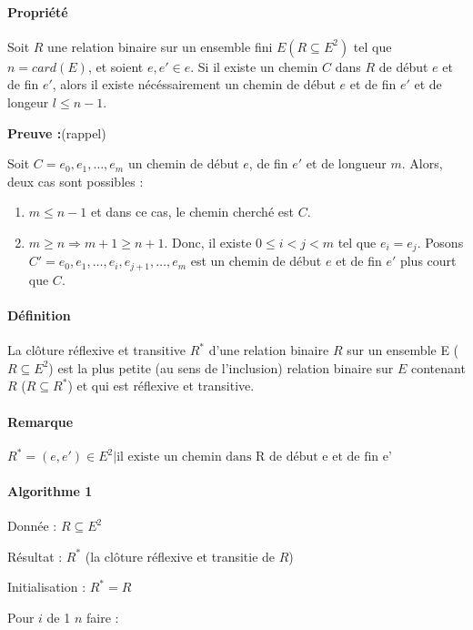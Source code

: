 \documentclass[12pt, a4paper]{report}
\begin{document}
\paragraph{Propriété}
Soit $R$ une relation binaire sur un ensemble fini $E (R\subseteq E^2)$ tel que
$n=card(E)$, et soient 
$e, e'\in e$. Si il existe un chemin $C$ dans $R$ de début $e$ et de fin $e'$,
alors il existe 
nécéssairement un chemin de début $e$ et de fin $e'$ et de longeur $l \leq n-1$.

\textbf{Preuve :}(rappel)

Soit $C = e_0, e_1, \dots, e_m$ un chemin de début $e$, de fin $e'$ et de
longueur $m$. Alors, 
deux cas sont possibles :

\begin{enumerate}
  \item $m \leq n-1$ et dans ce cas, le chemin cherché est $C$.
  \item $m \geq n \Rightarrow m+1 \geq n+1$. Donc, il existe $0\leq i < j < m$
  tel que $e_i = e_j$.
  Posons $C' = e_0, e_1, \dots, e_i, e_{j+1}, \dots, e_m$ est un chemin de
  début $e$ et de fin $e'$
  plus court que $C$.
\end{enumerate}

\paragraph{Définition}

La clôture réflexive et transitive $R^{*}$ d'une relation binaire $R$ sur un ensemble E
($R \subseteq E^2$) est la plus petite (au sens de l'inclusion) relation binaire sur $E$ contenant
$R$ ($R \subseteq R^{*}$) et qui est réflexive et transitive.

\paragraph{Remarque} $R^{*} = { (e, e') \in E^{2} | \textrm{il existe un chemin dans R de début e et de fin e'}}$

\paragraph{Algorithme 1}
Donnée : $R \subseteq E^2$

Résultat : $R^{*}$ (la clôture réflexive et transitie de $R$)

Initialisation : $R^{*} = R$

Pour $i$ de 1  $n$ faire :
\end{document}
